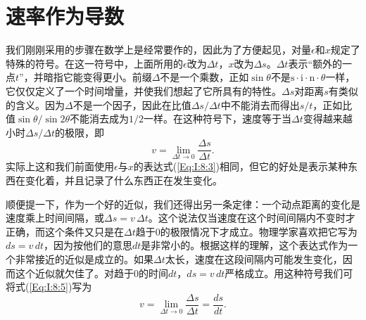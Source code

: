 \section{速率作为导数}
我们刚刚采用的步骤在数学上是经常要作的，因此为了方便起见，对量$\epsilon$和$x$规定了特殊的符号。在这一符号中，上面所用的$\epsilon$改为$\Delta t$，$x$改为$\Delta s$。$\Delta t$表示“额外的一点$t$”，并暗指它能变得更小。前缀$\Delta$不是一个乘数，正如$\sin \theta$不是$\text{s}\cdot\text{i}\cdot\text{n}\cdot\theta$一样，它仅仅定义了一个时间增量，并使我们想起了它所具有的特性。$\Delta s$对距离$s$有类似的含义。因为$\Delta$不是一个因子，因此在比值$\Delta s/\Delta t$中不能消去而得出$s/t$，正如比值$\sin\theta/\sin2\theta$不能消去成为$1/2$一样。在这种符号下，速度等于当$\Delta t$变得越来越小时$\Delta s/\Delta t$的极限，即
\begin{equation}
\label{Eq:I:8:5}
v=\lim_{\Delta t\to0}\frac{\Delta s}{\Delta t}.
\end{equation}
实际上这和我们前面使用$\epsilon$与$x$的表达式(\ref{Eq:I:8:3})相同，但它的好处是表示某种东西在变化着，并且记录了什么东西正在发生变化。

顺便提一下，作为一个好的近似，我们还得出另一条定律：一个动点距离的变化是速度乘上时间间隔，或$\Delta s=v\,\Delta t$。这个说法仅当速度在这个时间间隔内不变时才正确，而这个条件又只是在$\Delta t$趋于0的极限情况下才成立。物理学家喜欢把它写为$ds=v\,dt$，因为按他们的意思$dt$是非常小的。根据这样的理解，这个表达式作为一个非常接近的近似是成立的。如果$\Delta t$太长，速度在这段间隔内可能发生变化，因而这个近似就欠佳了。对趋于0的时间$dt$，$ds=v\,dt$严格成立。用这种符号我们可将式(\ref{Eq:I:8:5})写为
\begin{equation*}
v=\lim_{\Delta t\to0}\frac{\Delta s}{\Delta t}=\frac{ds}{dt}.
\end{equation*}

